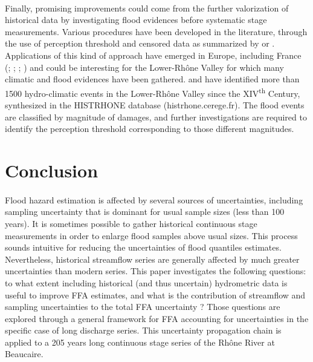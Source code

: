 \documentclass[11pt]{article}
\begin{document}
    \paragraph{}
    Finally, promising improvements could come from the further valorization of historical data by investigating flood evidences before systematic stage measurements. Various procedures have been developed in the literature, through the use of perception threshold and censored data as summarized by \citet{kjeldsen_documentary_2014} or \citet{brazdil_historical_2006}. Applications of this kind of approach have emerged in Europe, including France (\citet{naulet_flood_2005}; \citet{lang_extrapolation_2010}; \citet{neppel_flood_2010}; \citet{payrastre_usefulness_2011}) and could be interesting for the Lower-Rhône Valley for which many climatic and flood evidences have been gathered. \citet{pichard_sept_2014} and \citet{pichard_hydro-climatology_2017} have identified more than 1500 hydro-climatic events in the Lower-Rhône Valley since the XIV\textsuperscript{th} Century, synthesized in the HISTRHONE database (histrhone.cerege.fr). The flood events are classified by magnitude of damages, and further investigations are required to identify the perception threshold corresponding to those different magnitudes.     
    
\section{Conclusion}

    \paragraph{} Flood hazard estimation is affected by several sources of uncertainties, including sampling uncertainty that is dominant for usual sample sizes (less than 100 years). It is sometimes possible to gather historical continuous stage measurements in order to enlarge flood samples above usual sizes. This process sounds intuitive for reducing the uncertainties of flood quantiles estimates. Nevertheless, historical streamflow series are generally affected by much greater uncertainties than modern series. This paper investigates the following questions: to what extent including historical (and thus uncertain) hydrometric data is useful to improve FFA estimates, and what is the contribution of streamflow and sampling uncertainties to the total FFA uncertainty ? Those questions are explored through a general framework for FFA accounting for uncertainties in the specific case of long discharge series. This uncertainty propagation chain is applied to a 205 years long continuous stage series of the Rhône River at Beaucaire.
\end{document}
